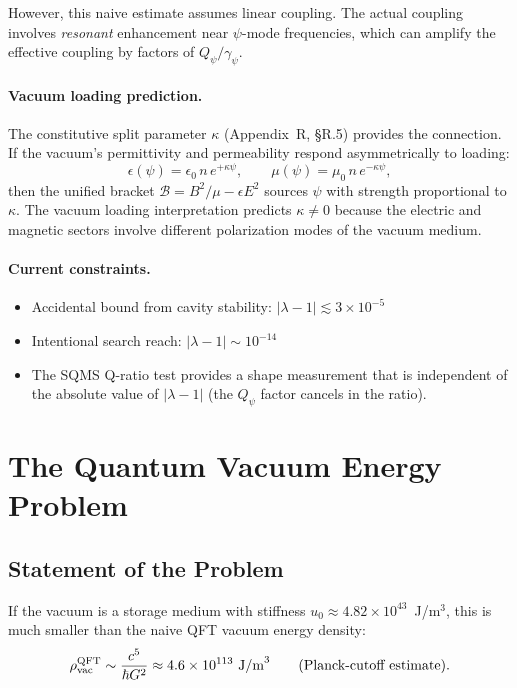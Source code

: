 \documentclass[11pt]{article}
\theoremstyle{plain}
\theoremstyle{definition}
\theoremstyle{remark}
\begin{document}
However, this naive estimate assumes linear coupling. The actual coupling
involves \emph{resonant} enhancement near $\psi$-mode frequencies, which
can amplify the effective coupling by factors of $Q_\psi/\gamma_\psi$.

\paragraph{Vacuum loading prediction.}
The constitutive split parameter $\kappa$ (Appendix~R, \S R.5) provides
the connection. If the vacuum's permittivity and permeability respond
asymmetrically to loading:
\begin{equation}
\epsilon(\psi) = \epsilon_0\,n\,e^{+\kappa\psi}, \qquad
\mu(\psi) = \mu_0\,n\,e^{-\kappa\psi},
\end{equation}
then the unified bracket $\mathcal{B} = B^2/\mu - \epsilon E^2$ sources
$\psi$ with strength proportional to $\kappa$. The vacuum loading
interpretation predicts $\kappa \neq 0$ because the electric and magnetic
sectors involve different polarization modes of the vacuum medium.

\paragraph{Current constraints.}
\begin{itemize}
\item Accidental bound from cavity stability:
$|\lambda - 1| \lesssim 3 \times 10^{-5}$
\item Intentional search reach:
$|\lambda - 1| \sim 10^{-14}$
\item The SQMS Q-ratio test provides a shape measurement that is
independent of the absolute value of $|\lambda - 1|$ (the $Q_\psi$
factor cancels in the ratio).
\end{itemize}


\section{The Quantum Vacuum Energy Problem}
\label{sec:vacuum-energy}

\subsection{Statement of the Problem}

If the vacuum is a storage medium with stiffness $u_0 \approx 4.82 \times 10^{43}$~J/m$^3$,
this is much smaller than the naive QFT vacuum energy density:
\begin{equation}
\rho_{\rm vac}^{\rm QFT} \sim \frac{c^5}{\hbar G^2}
\approx 4.6 \times 10^{113}~\text{J/m}^3
\qquad (\text{Planck-cutoff estimate}).
\end{equation}
\end{document}
